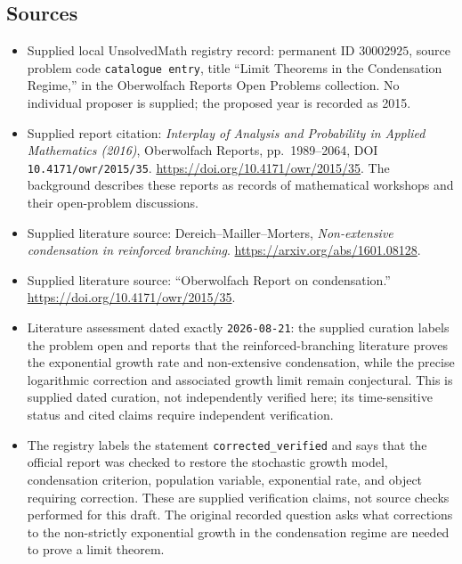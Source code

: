 \documentclass[11pt]{article}
\begin{document}
\subsection{Sources}
\begin{itemize}
\item Supplied local UnsolvedMath registry record: permanent ID \(30002925\), source problem code \texttt{catalogue entry}, title ``Limit Theorems in the Condensation Regime,'' in the Oberwolfach Reports Open Problems collection. No individual proposer is supplied; the proposed year is recorded as 2015.
\item Supplied report citation: \emph{Interplay of Analysis and Probability in Applied Mathematics (2016)}, Oberwolfach Reports, pp.\ 1989--2064, DOI \texttt{10.4171/owr/2015/35}. \url{https://doi.org/10.4171/owr/2015/35}. The background describes these reports as records of mathematical workshops and their open-problem discussions.
\item Supplied literature source: Dereich--Mailler--Morters, \emph{Non-extensive condensation in reinforced branching}. \url{https://arxiv.org/abs/1601.08128}.
\item Supplied literature source: ``Oberwolfach Report on condensation.'' \url{https://doi.org/10.4171/owr/2015/35}.
\item Literature assessment dated exactly \texttt{2026-08-21}: the supplied curation labels the problem open and reports that the reinforced-branching literature proves the exponential growth rate and non-extensive condensation, while the precise logarithmic correction and associated growth limit remain conjectural. This is supplied dated curation, not independently verified here; its time-sensitive status and cited claims require independent verification.
\item The registry labels the statement \texttt{corrected\_verified} and says that the official report was checked to restore the stochastic growth model, condensation criterion, population variable, exponential rate, and object requiring correction. These are supplied verification claims, not source checks performed for this draft. The original recorded question asks what corrections to the non-strictly exponential growth in the condensation regime are needed to prove a limit theorem.
\end{itemize}
\end{document}
